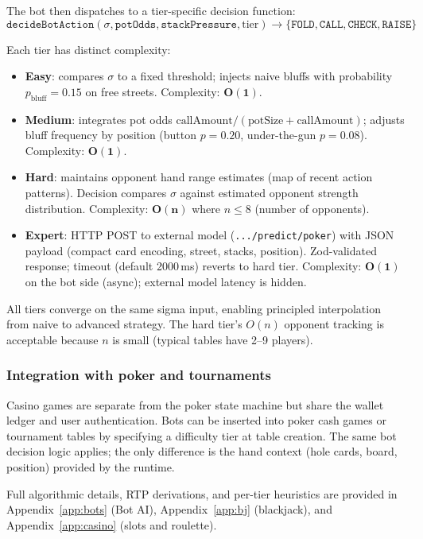 \documentclass[11pt,a4paper]{article}
\begin{document}
The bot then dispatches to a tier-specific decision function:
\[
\texttt{decideBotAction}(\sigma, \texttt{potOdds}, \texttt{stackPressure}, \text{tier}) \to \{\texttt{FOLD}, \texttt{CALL}, \texttt{CHECK}, \texttt{RAISE}\}
\]

Each tier has distinct complexity:
\begin{itemize}
\item \textbf{Easy}: compares $\sigma$ to a fixed threshold; injects naive bluffs with probability $p_{\text{bluff}} = 0.15$ on free streets. Complexity: $\mathbf{O(1)}$.
\item \textbf{Medium}: integrates pot odds $\text{callAmount} / (\text{potSize} + \text{callAmount})$; adjusts bluff frequency by position (button $p=0.20$, under-the-gun $p=0.08$). Complexity: $\mathbf{O(1)}$.
\item \textbf{Hard}: maintains opponent hand range estimates (map of recent action patterns). Decision compares $\sigma$ against estimated opponent strength distribution. Complexity: $\mathbf{O(n)}$ where $n \le 8$ (number of opponents).
\item \textbf{Expert}: HTTP POST to external model (\texttt{.../predict/poker}) with JSON payload (compact card encoding, street, stacks, position). Zod-validated response; timeout (default 2000\,ms) reverts to hard tier. Complexity: $\mathbf{O(1)}$ on the bot side (async); external model latency is hidden.
\end{itemize}

All tiers converge on the same sigma input, enabling principled interpolation from naive to advanced strategy. The hard tier's $O(n)$ opponent tracking is acceptable because $n$ is small (typical tables have 2--9 players).

\subsubsection{Integration with poker and tournaments}

Casino games are separate from the poker state machine but share the wallet ledger and user authentication. Bots can be inserted into poker cash games or tournament tables by specifying a difficulty tier at table creation. The same bot decision logic applies; the only difference is the hand context (hole cards, board, position) provided by the runtime.

Full algorithmic details, RTP derivations, and per-tier heuristics are provided in Appendix~\ref{app:bots} (Bot AI), Appendix~\ref{app:bj} (blackjack), and Appendix~\ref{app:casino} (slots and roulette).
\end{document}
